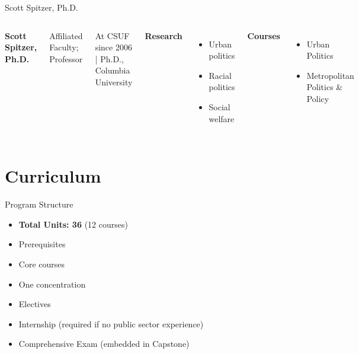 \documentclass[10pt]{beamer}
\newlength{\imageheight}
\begin{document}
\begin{frame}{Scott Spitzer, Ph.D.}
\begin{columns}[T,onlytextwidth]
    \raggedright
    {\large\bfseries Scott Spitzer, Ph.D.}\par
    {Affiliated Faculty; Professor}\par
    {\footnotesize At CSUF since 2006 \quad | \quad Ph.D., Columbia University}\par\vspace{0.4em}

    \textbf{Research}
    \begin{itemize}
      \item Urban politics
      \item Racial politics
      \item Social welfare
    \end{itemize}

    \textbf{Courses}
    \begin{itemize}
      \item Urban Politics
      \item Metropolitan Politics \& Policy
    \end{itemize}

    \vspace*{0.25cm}
    \includegraphics[height=\imageheight]{images/spitzer.png}
\end{columns}
\end{frame}

\section{\textcolor{titanorange}{Curriculum}}

\begin{frame}{Program Structure}
\begin{itemize}
  \item \textbf{Total Units: 36} (12 courses)
  \item Prerequisites
  \item Core courses
  \item One concentration
  \item Electives
  \item Internship (required if no public sector experience)
  \item Comprehensive Exam (embedded in Capstone)
\end{itemize}
\end{frame}
\end{document}
